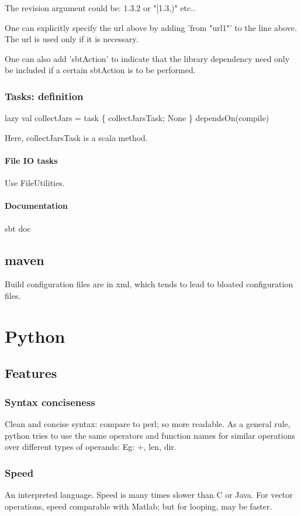 The revision argument could be: 1.3.2 or "[1.3,)" etc..

One can explicitly specify the url above by adding 'from "url1"' to the line above. The url is used only if it is necessary.

One can also add 'sbtAction' to indicate that the library dependency need only be included if a certain sbtAction is to be performed. \chk

\subsection{Tasks: definition}
lazy val collectJars = task \{ collectJarsTask; None \} dependsOn(compile)

Here, collectJarsTask is a scala method.

\subsubsection{File IO tasks}
Use FileUtilities.

\subsubsection{Documentation}
sbt doc

\section{maven}
Build configuration files are in xml, which tends to lead to bloated configuration files.


\chapter{Python}

\section{Features}
\subsection{Syntax conciseness}
Clean and concise syntax: compare to perl; so more readable. As a general rule, python tries to use the same operators and function names for similar operations over different types of operands: Eg: +, len, dir.

\subsection{Speed}
An interpreted language. Speed is many times slower than C or Java. For vector operations, speed comparable with Matlab; but for looping, may be faster.

